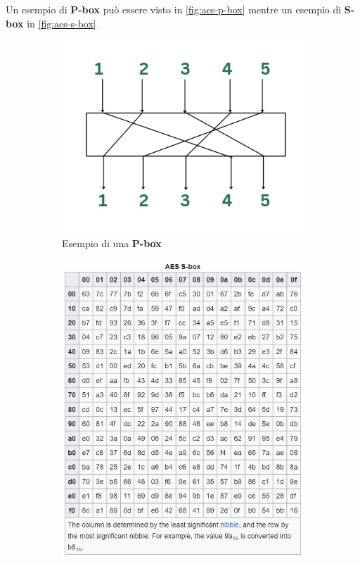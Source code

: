 Un esempio di \textbf{P-box} può essere visto in \autoref{fig:aes-p-box} mentre un esempio di \textbf{S-box} in \autoref{fig:aes-s-box}


\begin{figure}[h]
    \begin{subfigure}{0.48\textwidth}
        \includegraphics[width=1\textwidth]{capitoli/figure-crittografia/p-box.png}
        \caption{Esempio di una \textbf{P-box}}
        \label{fig:aes-p-box}
    \end{subfigure}
    \hfill
    \begin{subfigure}{0.48\textwidth}
        \includegraphics[width=1\textwidth]{capitoli/figure-crittografia/aes-s-box.png}

\end{subfigure}
\end{figure}
